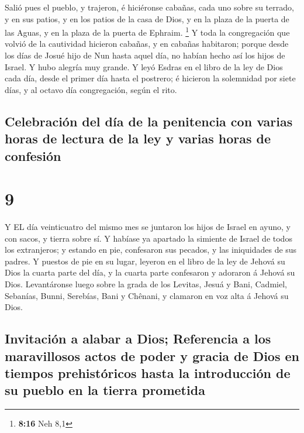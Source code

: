  Salió pues el pueblo, y trajeron, é hiciéronse cabañas,
cada uno sobre su terrado, y en sus patios, y en los patios de la casa
de Dios, y en la plaza de la puerta de las Aguas, y en la plaza de la
puerta de Ephraim. \footnote{\textbf{8:16} Neh 8,1}  Y toda
la congregación que volvió de la cautividad hicieron cabañas, y en
cabañas habitaron; porque desde los días de Josué hijo de Nun hasta
aquel día, no habían hecho así los hijos de Israel. Y hubo alegría muy
grande.  Y leyó Esdras en el libro de la ley de Dios cada
día, desde el primer día hasta el postrero; é hicieron la solemnidad por
siete días, y al octavo día congregación, según el rito.

\hypertarget{celebraciuxf3n-del-duxeda-de-la-penitencia-con-varias-horas-de-lectura-de-la-ley-y-varias-horas-de-confesiuxf3n}{%
\subsection{Celebración del día de la penitencia con varias horas de
lectura de la ley y varias horas de
confesión}\label{celebraciuxf3n-del-duxeda-de-la-penitencia-con-varias-horas-de-lectura-de-la-ley-y-varias-horas-de-confesiuxf3n}}

\hypertarget{section-8}{%
\section{9}\label{section-8}}

 Y EL día veinticuatro del mismo mes se juntaron los hijos
de Israel en ayuno, y con sacos, y tierra sobre sí.  Y
habíase ya apartado la simiente de Israel de todos los extranjeros; y
estando en pie, confesaron sus pecados, y las iniquidades de sus padres.
 Y puestos de pie en su lugar, leyeron en el libro de la ley
de Jehová su Dios la cuarta parte del día, y la cuarta parte confesaron
y adoraron á Jehová su Dios.  Levantáronse luego sobre la
grada de los Levitas, Jesuá y Bani, Cadmiel, Sebanías, Bunni, Serebías,
Bani y Chênani, y clamaron en voz alta á Jehová su Dios.

\hypertarget{invitaciuxf3n-a-alabar-a-dios-referencia-a-los-maravillosos-actos-de-poder-y-gracia-de-dios-en-tiempos-prehistuxf3ricos-hasta-la-introducciuxf3n-de-su-pueblo-en-la-tierra-prometida}{%
\subsection{Invitación a alabar a Dios; Referencia a los maravillosos
actos de poder y gracia de Dios en tiempos prehistóricos hasta la
introducción de su pueblo en la tierra
prometida}\label{invitaciuxf3n-a-alabar-a-dios-referencia-a-los-maravillosos-actos-de-poder-y-gracia-de-dios-en-tiempos-prehistuxf3ricos-hasta-la-introducciuxf3n-de-su-pueblo-en-la-tierra-prometida}}

